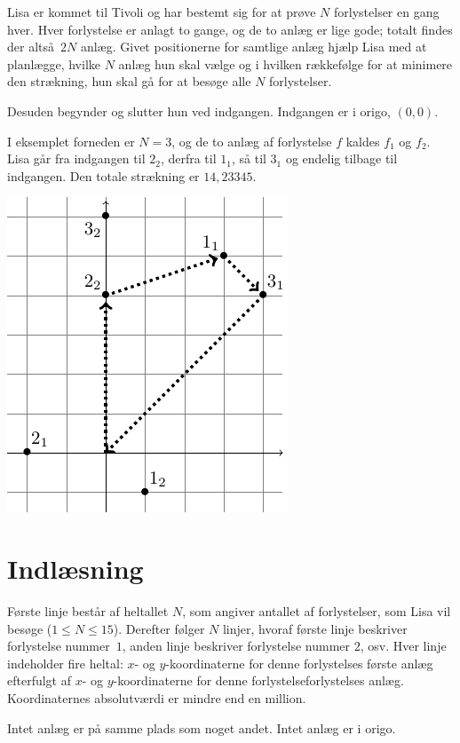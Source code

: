 
Lisa er kommet til Tivoli og har bestemt sig for at prøve $N$ forlystelser en gang hver.
Hver forlystelse er anlagt to gange, og de to anlæg er lige gode; totalt findes der altså $2N$ anlæg.
Givet positionerne for samtlige anlæg hjælp Lisa med at planlægge, hvilke $N$ anlæg hun skal vælge og i hvilken rækkefølge for at minimere den strækning, hun skal gå for at besøge alle $N$ forlystelser.

Desuden begynder og slutter hun ved indgangen.
Indgangen er i origo, $(0,0)$.

I eksemplet forneden er $N=3$, og de to anlæg af forlystelse $f$ kaldes $f_1$ og $f_2$.
Lisa går fra indgangen til $2_2$, derfra til $1_1$, så til $3_1$ og endelig tilbage til indgangen.
Den totale strækning er $14{,}23345$.

\bigskip
\includegraphics{img/tivoli-sample-img.pdf}

\section*{Indlæsning}
Første linje består af heltallet $N$, som angiver antallet af forlystelser, som Lisa vil besøge ($1 \le N \le 15$).
Derefter følger $N$ linjer, hvoraf første linje beskriver forlystelse  nummer~$1$, anden linje beskriver forlystelse nummer $2$, osv.
Hver linje indeholder fire heltal: $x$- og $y$-koordinaterne for denne forlystelses første anlæg efterfulgt af $x$- og $y$-koordinaterne for denne forlystelseforlystelses anlæg.
Koordinaternes absolutværdi er mindre end en million.

Intet anlæg er på samme plads som noget andet.
Intet anlæg er i origo.

